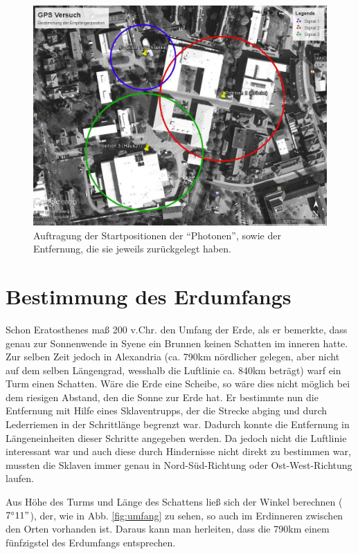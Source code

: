 \documentclass[12pt,a4paper,titlepage,headinclude,bibtotoc]{scrartcl}
\begin{document}
\begin{figure}[h]
	\centering
	\includegraphics[scale=0.5]{GPS}
	\caption{Auftragung der Startpositionen der "`Photonen"', sowie der Entfernung, die sie jeweils zurückgelegt haben.}
	\label{fig:gps}
\end{figure}

\section{Bestimmung des Erdumfangs}
Schon Eratosthenes maß 200 v.Chr. den Umfang der Erde, als er bemerkte, dass genau zur Sonnenwende in Syene ein Brunnen keinen Schatten im inneren hatte.
Zur selben Zeit jedoch in Alexandria (ca. 790km nördlicher gelegen, aber nicht auf dem selben Längengrad, wesshalb die Luftlinie ca. 840km beträgt) warf ein Turm einen Schatten.
Wäre die Erde eine Scheibe, so wäre dies nicht möglich bei dem riesigen Abstand, den die Sonne zur Erde hat.
Er bestimmte nun die Entfernung mit Hilfe eines Sklaventrupps, der die Strecke abging und durch Lederriemen in der Schrittlänge begrenzt war.
Dadurch konnte die Entfernung in Längeneinheiten dieser Schritte angegeben werden.
Da jedoch nicht die Luftlinie interessant war und auch diese durch Hindernisse nicht direkt zu bestimmen war, mussten die Sklaven immer genau in Nord-Süd-Richtung oder Ost-West-Richtung laufen.

Aus Höhe des Turms und Länge des Schattens ließ sich der Winkel berechnen ($7^\circ11"$), der, wie in Abb. \ref{fig:umfang} zu sehen, so auch im Erdinneren zwischen den Orten vorhanden ist.
Daraus kann man herleiten, dass die 790km einem fünfzigstel des Erdumfangs entsprechen.











\end{document}
